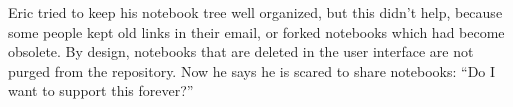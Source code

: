 Eric tried to keep his notebook tree well organized, but this didn't help,
because some people kept old links in their email, or forked notebooks which 
had become obsolete. By design, notebooks that are deleted in the user interface
are not purged from the repository. Now he says he is scared to share notebooks:
``Do I want to support this forever?''


